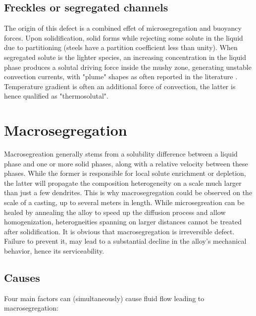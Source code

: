 \subsection*{Freckles or segregated channels} 
%
The origin of this defect is a combined effet of microsegregation and buoyancy forces. 
Upon solidification, solid forms while rejecting some solute in the liquid due to partitioning 
(steels have a partition coefficient less than unity).
When segregated solute is the lighter species, an increasing concentration in the liquid phase 
produces a solutal driving force inside the mushy zone, generating unstable convection currents, 
with "plume" shapes as often reported in the literature \citep{sarazin_studies_1992, schneider_modeling_1997,
shevchenko_chimney_2013}. Temperature gradient is often an additional force of convection, the latter is hence 
qualified as "thermosolutal".
%
\section{Macrosegregation}
%
Macrosegreation generally stems from a solubility difference between a liquid phase and one or more solid phases, along with
a relative velocity between these phases. While the former is responsible for local solute enrichment or depletion, the latter
will propagate the composition heterogeneity on a scale much larger than just a few dendrites.
This is why macrosegregation could be observed on the scale of a casting, up to several meters in length. 
While microsegreation can be healed by annealing the alloy to speed up the diffusion process and allow homogenization, heterogneities 
spanning on larger distances cannot be treated after solidification. It is obvious that macrosegregation is irreversible defect. 
Failure to prevent it, may lead to a substantial decline in the alloy's mechanical behavior, hence its serviceability.
%
%
\subsection{Causes}
Four main factors can (simultaneously) cause fluid flow leading to macrosegregation:
%
%
